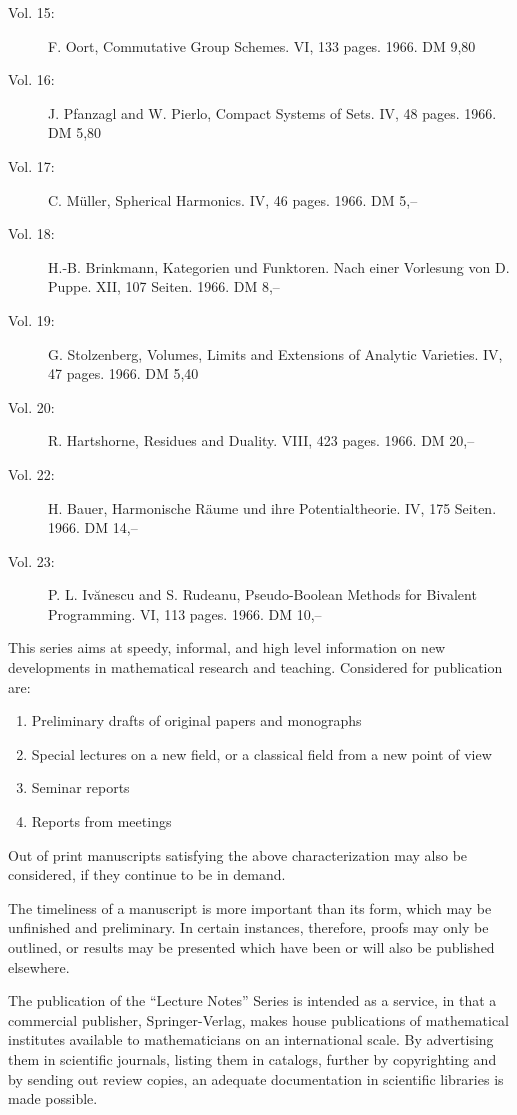 \begin{description}
\item[Vol. 15:] F. Oort, Commutative Group Schemes. VI, 133 pages. 1966. DM 9,80
\item[Vol. 16:] J. Pfanzagl and W. Pierlo, Compact Systems of Sets. IV, 48 pages. 1966. DM 5,80
\item[Vol. 17:] C. M\"uller, Spherical Harmonics. IV, 46 pages. 1966. DM 5,--
\item[Vol. 18:] H.-B. Brinkmann, Kategorien und Funktoren. Nach einer Vorlesung von D. Puppe. XII, 107 Seiten. 1966. DM 8,--
\item[Vol. 19:] G. Stolzenberg, Volumes, Limits and Extensions of Analytic Varieties. IV, 47 pages. 1966. DM 5,40
\item[Vol. 20:] R. Hartshorne, Residues and Duality. VIII, 423 pages. 1966. DM 20,--
\item[Vol. 22:] H. Bauer, Harmonische R\"aume und ihre Potentialtheorie. IV, 175 Seiten. 1966. DM 14,--
\item[Vol. 23:] P. L. Iv\u{a}nescu and S. Rudeanu, Pseudo-Boolean Methods for Bivalent Programming. VI, 113 pages. 1966. DM 10,--
\end{description}

\clearpage

\thispagestyle{plain}
This series aims at speedy, informal, and high level information on new developments in mathematical research and teaching. Considered for publication are:
\begin{enumerate}[leftmargin=2.5em]
\item Preliminary drafts of original papers and monographs
\item Special lectures on a new field, or a classical field from a new point of view
\item Seminar reports
\item Reports from meetings
\end{enumerate}
Out of print manuscripts satisfying the above characterization may also be considered, if they continue to be in demand.

\medskip
The timeliness of a manuscript is more important than its form, which may be unfinished and preliminary. In certain instances, therefore, proofs may only be outlined, or results may be presented which have been or will also be published elsewhere.

\medskip
The publication of the ``Lecture Notes'' Series is intended as a service, in that a commercial publisher, Springer-Verlag, makes house publications of mathematical institutes available to mathematicians on an international scale. By advertising them in scientific journals, listing them in catalogs, further by copyrighting and by sending out review copies, an adequate documentation in scientific libraries is made possible.

